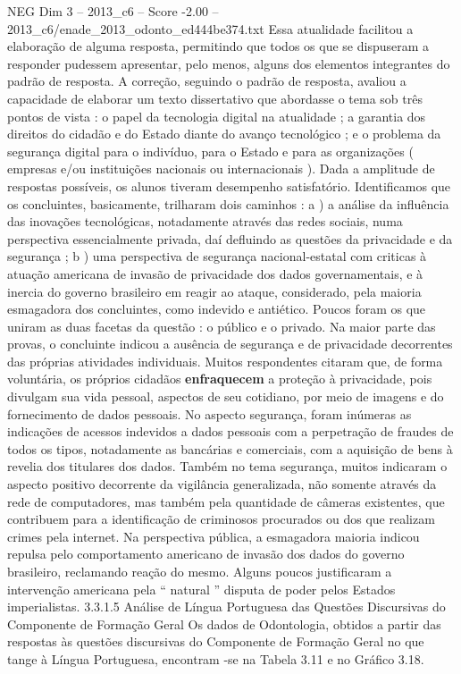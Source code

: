 \begin{textsample}{NEG Dim 3 – 2013\_c6 – Score -2.00 – 2013\_c6/enade\_2013\_odonto\_ed444be374.txt}
Essa atualidade facilitou a elaboração de alguma resposta, permitindo que todos os que se dispuseram a responder pudessem apresentar, pelo menos, alguns dos elementos integrantes do padrão de resposta.
A correção, seguindo o padrão de resposta, avaliou a capacidade de elaborar um texto dissertativo que abordasse o tema sob três pontos de vista : o papel da tecnologia digital na atualidade ; a garantia dos direitos do cidadão e do Estado diante do avanço tecnológico ; e o problema da segurança digital para o indivíduo, para o Estado e para as organizações ( empresas e/ou instituições nacionais ou internacionais ).
Dada a amplitude de respostas possíveis, os alunos tiveram desempenho satisfatório.
Identificamos que os concluintes, basicamente, trilharam dois caminhos : a ) a análise da influência das inovações tecnológicas, notadamente através das redes sociais, numa perspectiva essencialmente privada, daí defluindo as questões da privacidade e da segurança ; b ) uma perspectiva de segurança nacional-estatal com criticas à atuação americana de invasão de privacidade dos dados governamentais, e à inercia do governo brasileiro em reagir ao ataque, considerado, pela maioria esmagadora dos concluintes, como indevido e antiético.
Poucos foram os que uniram as duas facetas da questão : o público e o privado.
Na maior parte das provas, o concluinte indicou a ausência de segurança e de privacidade decorrentes das próprias atividades individuais.
Muitos respondentes citaram que, de forma voluntária, os próprios cidadãos \textbf{enfraquecem} a proteção à privacidade, pois divulgam sua vida pessoal, aspectos de seu cotidiano, por meio de imagens e do fornecimento de dados pessoais.
No aspecto segurança, foram inúmeras as indicações de acessos indevidos a dados pessoais com a perpetração de fraudes de todos os tipos, notadamente as bancárias e comerciais, com a aquisição de bens à revelia dos titulares dos dados.
Também no tema segurança, muitos indicaram o aspecto positivo decorrente da vigilância generalizada, não somente através da rede de computadores, mas também pela quantidade de câmeras existentes, que contribuem para a identificação de criminosos procurados ou dos que realizam crimes pela internet.
Na perspectiva pública, a esmagadora maioria indicou repulsa pelo comportamento americano de invasão dos dados do governo brasileiro, reclamando reação do mesmo.
Alguns poucos justificaram a intervenção americana pela “ natural ” disputa de poder pelos Estados imperialistas. 3.3.1.5 Análise de Língua Portuguesa das Questões Discursivas do Componente de Formação Geral Os dados de Odontologia, obtidos a partir das respostas às questões discursivas do Componente de Formação Geral no que tange à Língua Portuguesa, encontram -se na Tabela 3.11 e no Gráfico 3.18.

\end{textsample}
